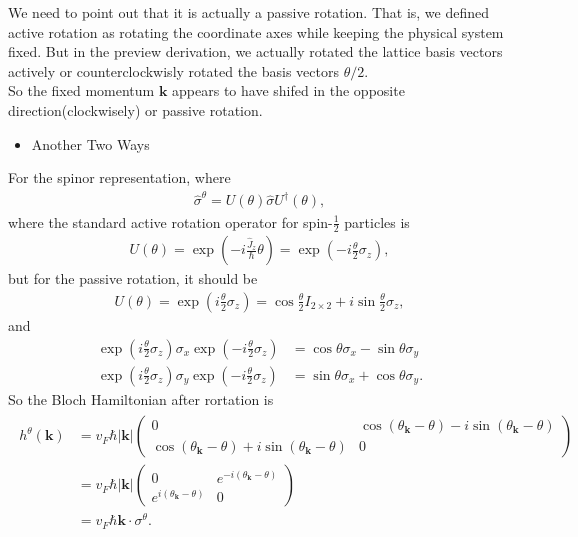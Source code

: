 \documentclass[10pt, oneside]{article}
\newcommand{\te}{\theta}
\newcommand{\p}[1]{\left(#1\right)}
\begin{document}
\begin{framed}
We need to point out that it is actually a passive rotation. That is, we defined active rotation as rotating the coordinate axes while keeping the physical system fixed. But in the preview derivation, we actually rotated the lattice basis vectors  actively or counterclockwisly rotated the basis vectors \(\te/2\). \\

So the fixed momentum \(\bm{k}\) appears to have shifed in the opposite direction(clockwisely) or passive rotation.
\end{framed}

\begin{itemize}
	\item Another Two Ways
\end{itemize}

For the spinor representation, where 
\begin{align}
	\hat{\sigma}^{\te} = U\p{\te} \hat{\sigma} U^{\dagger} \p{\te},
\end{align}
where the standard active rotation operator for spin-\(\frac{1}{2}\) particles is
\begin{align}
	U\p{\theta} = \exp\p{-i \frac{\hat{J}_{z}}{\hbar} \theta} = \exp\p{-i \frac{\theta}{2} \sigma_{z}},
\end{align}
but for the passive rotation, it should be
\begin{align}
	U\p{\te} = \exp\p{i \frac{\te}{2} \sigma_{z}} = \cos\frac{\theta}{2}I_{2\times2}+ i\sin\frac{\theta}{2}\sigma_z,
\end{align}
and
\begin{align}
	\exp\left(i\frac{\theta}{2}\sigma_z\right)\sigma_{x} \exp\left(-i\frac{\theta}{2}\sigma_z\right) &= \cos \theta \sigma_x - \sin \theta \sigma_y \\
	\exp\left(i\frac{\theta}{2}\sigma_z\right)\sigma_{y} \exp\left(-i\frac{\theta}{2}\sigma_z\right) &= \sin \theta \sigma_x +  \cos \theta \sigma_y.
\end{align}
So the Bloch Hamiltonian after rortation is 
\begin{align}
	\begin{split}
		h^{\te} \p{\bm{k}} 
		& = v_F \hbar |\bm{k}| \begin{pmatrix}
			0 & \cos \p{\te_{\bm{k}} - \te} - i \sin \p{\te_{\bm{k}} - \te} \\
			\cos \p{\te_{\bm{k}} - \te} + i \sin \p{\te_{\bm{k}} - \te} & 0
		\end{pmatrix} \\
		& = v_F \hbar |\bm{k}| \begin{pmatrix}
			0 & e^{-i \p{\te_{\bm{k}} - \te}} \\
			e^{i \p{\te_{\bm{k}} - \te}} & 0
		\end{pmatrix} \\
		& = v_F \hbar \bm{k} \cdot \sigma^{\te} .
	\end{split}
\end{align}
\end{document}
